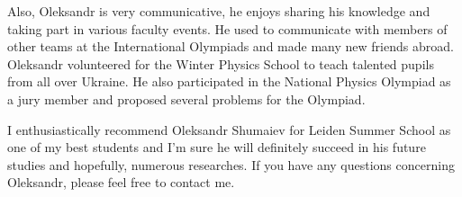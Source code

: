 \documentclass[12pt,a4paper]{article}
\begin{document}
Also, Oleksandr is very communicative, he enjoys sharing his knowledge and taking part in various faculty events. He used to communicate with members of other teams at the International Olympiads and made many new friends abroad. Oleksandr volunteered for the Winter Physics School to teach talented pupils from all over Ukraine. He also participated in the National Physics Olympiad as a jury member and proposed several problems for the Olympiad.

I enthusiastically recommend Oleksandr Shumaiev for Leiden Summer School as one of my best students and I'm sure he will definitely succeed in his future studies and hopefully, numerous researches. If you have any questions concerning Oleksandr, please feel free to contact me.
\end{document}
